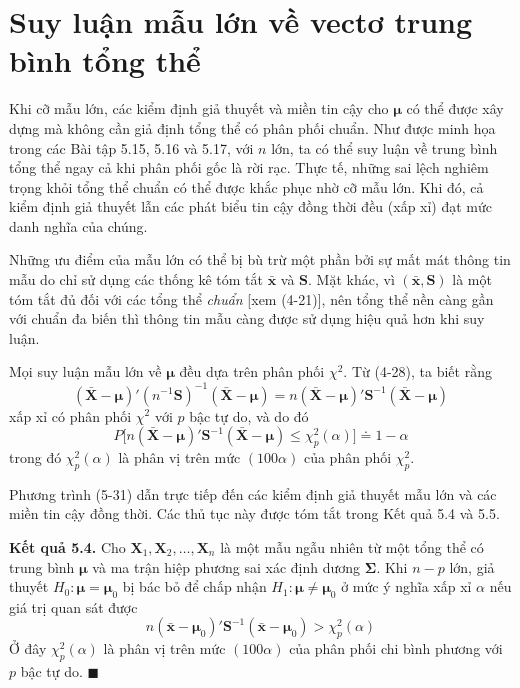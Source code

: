 
\section{Suy luận mẫu lớn về vectơ trung bình tổng thể}
\label{sec:ch05-05}

Khi cỡ mẫu lớn, các kiểm định giả thuyết và miền tin cậy cho $\boldsymbol{\mu}$ có thể được xây dựng mà không cần giả định tổng thể có phân phối chuẩn. Như được minh họa trong các Bài tập 5.15, 5.16 và 5.17, với $n$ lớn, ta có thể suy luận về trung bình tổng thể ngay cả khi phân phối gốc là rời rạc. Thực tế, những sai lệch nghiêm trọng khỏi tổng thể chuẩn có thể được khắc phục nhờ cỡ mẫu lớn. Khi đó, cả kiểm định giả thuyết lẫn các phát biểu tin cậy đồng thời đều (xấp xỉ) đạt mức danh nghĩa của chúng.

Những ưu điểm của mẫu lớn có thể bị bù trừ một phần bởi sự mất mát thông tin mẫu do chỉ sử dụng các thống kê tóm tắt $\bar{\mathbf{x}}$ và $\mathbf{S}$. Mặt khác, vì $(\bar{\mathbf{x}}, \mathbf{S})$ là một tóm tắt đủ đối với các tổng thể \emph{chuẩn} [xem (4-21)], nên tổng thể nền càng gần với chuẩn đa biến thì thông tin mẫu càng được sử dụng hiệu quả hơn khi suy luận.

Mọi suy luận mẫu lớn về $\boldsymbol{\mu}$ đều dựa trên phân phối $\chi^2$. Từ (4-28), ta biết rằng
\[
    (\bar{\mathbf{X}}-\boldsymbol{\mu})'(n^{-1}\mathbf{S})^{-1}(\bar{\mathbf{X}}-\boldsymbol{\mu}) = n(\bar{\mathbf{X}}-\boldsymbol{\mu})'\mathbf{S}^{-1}(\bar{\mathbf{X}}-\boldsymbol{\mu})
\]
xấp xỉ có phân phối $\chi^2$ với $p$ bậc tự do, và do đó
\setcounter{equation}{30}
\begin{equation}\label{eq:5-31}
    P\bigl[n(\bar{\mathbf{X}}-\boldsymbol{\mu})'\mathbf{S}^{-1}(\bar{\mathbf{X}}-\boldsymbol{\mu}) \le \chi_p^2(\alpha)\bigr] \doteq 1-\alpha
\end{equation}
trong đó $\chi_p^2(\alpha)$ là phân vị trên mức $(100\alpha)$ của phân phối $\chi_p^2$.

Phương trình (5-31) dẫn trực tiếp đến các kiểm định giả thuyết mẫu lớn và các miền tin cậy đồng thời. Các thủ tục này được tóm tắt trong Kết quả 5.4 và 5.5.

\medskip
\noindent\textbf{Kết quả 5.4.} Cho $\mathbf{X}_1, \mathbf{X}_2, \dots, \mathbf{X}_n$ là một mẫu ngẫu nhiên từ một tổng thể có trung bình $\boldsymbol{\mu}$ và ma trận hiệp phương sai xác định dương $\boldsymbol{\Sigma}$. Khi $n-p$ lớn, giả thuyết $H_0\colon \boldsymbol{\mu}=\boldsymbol{\mu}_0$ bị bác bỏ để chấp nhận $H_1\colon \boldsymbol{\mu}\neq\boldsymbol{\mu}_0$ ở mức ý nghĩa xấp xỉ $\alpha$ nếu giá trị quan sát được
\[
    n(\bar{\mathbf{x}}-\boldsymbol{\mu}_0)'\mathbf{S}^{-1}(\bar{\mathbf{x}}-\boldsymbol{\mu}_0) > \chi_p^2(\alpha)
\]
Ở đây $\chi_p^2(\alpha)$ là phân vị trên mức $(100\alpha)$ của phân phối chi bình phương với $p$ bậc tự do. \hfill$\blacksquare$

